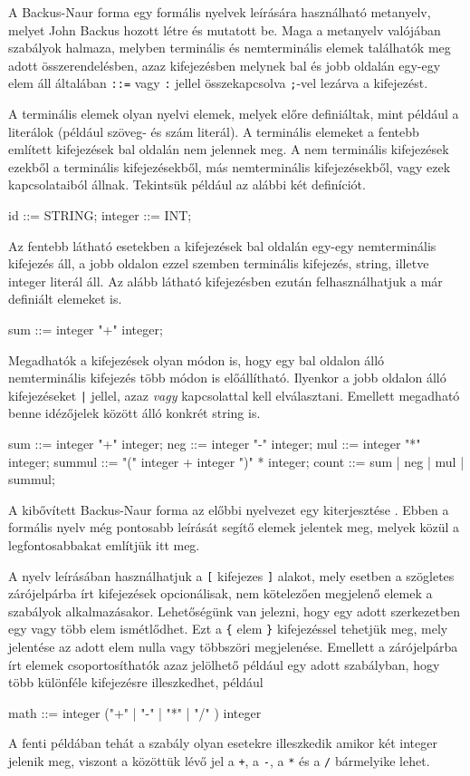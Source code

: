 A Backus-Naur forma egy formális nyelvek leírására használható metanyelv, melyet John Backus hozott létre és mutatott be. Maga a metanyelv valójában szabályok halmaza, melyben terminális és nemterminális elemek találhatók meg adott összerendelésben, azaz kifejezésben melynek bal és jobb oldalán egy-egy elem áll általában \texttt{::=} vagy \texttt{:} jellel összekapcsolva \texttt{;}-vel lezárva a kifejezést.

A terminális elemek olyan nyelvi elemek, melyek előre definiáltak, mint például a literálok (például szöveg- és szám literál).
A terminális elemeket a fentebb említett kifejezések bal oldalán nem jelennek meg.
A nem terminális kifejezések ezekből a terminális kifejezésekből, más nemterminális kifejezésekből, vagy ezek kapcsolataiból állnak. Tekintsük például az alábbi két definíciót.
\begin{cpp}
id ::= STRING;
integer ::= INT;
\end{cpp}
Az fentebb látható esetekben a kifejezések bal oldalán egy-egy nemterminális kifejezés áll, a jobb oldalon ezzel szemben terminális kifejezés, string, illetve integer literál áll. Az alább látható kifejezésben ezután felhasználhatjuk a már definiált elemeket is.
\begin{cpp}
sum ::=	integer "+" integer;
\end{cpp}
Megadhatók a kifejezések olyan módon is, hogy egy bal oldalon álló nemterminális kifejezés több módon is előállítható. Ilyenkor a jobb oldalon álló kifejezéseket \texttt{|} jellel, azaz \textit{vagy} kapcsolattal kell elválasztani. Emellett megadható benne idézőjelek között álló konkrét string is.

\begin{cpp}
sum ::= integer "+" integer;
neg ::= integer "-" integer;
mul ::= integer "*" integer;
summul ::= "(" integer + integer ")" * integer;
count ::= sum | neg | mul | summul;
\end{cpp}

A kibővített Backus-Naur forma az előbbi nyelvezet egy kiterjesztése \cite{scowen1998extended}.
Ebben a formális nyelv még pontosabb leírását segítő elemek jelentek meg, melyek közül a legfontosabbakat említjük itt meg.

A nyelv leírásában használhatjuk a \texttt{[} kifejezes \texttt{]} alakot, mely esetben a szögletes zárójelpárba írt kifejezések opcionálisak, nem kötelezően megjelenő elemek a szabályok alkalmazásakor.
Lehetőségünk van jelezni, hogy egy adott szerkezetben egy vagy több elem ismétlődhet. Ezt a \texttt{\{} elem \texttt{\}} kifejezéssel tehetjük meg, mely jelentése az adott elem nulla vagy többszöri megjelenése.
Emellett a zárójelpárba írt elemek csoportosíthatók azaz jelölhető például egy adott szabályban, hogy több különféle kifejezésre illeszkedhet, például
\begin{cpp}
math ::= integer ("+" | "-" | "*" | "/" ) integer
\end{cpp}
A fenti példában tehát a szabály olyan esetekre illeszkedik amikor két integer jelenik meg, viszont a közöttük lévő jel a \texttt{+}, a \texttt{-}, a \texttt{*} és a \texttt{/} bármelyike lehet.

